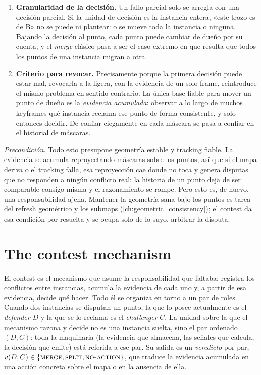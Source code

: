 \begin{enumerate}
  \item \textbf{Granularidad de la decisión.}
  Un fallo parcial solo se arregla con una decisión parcial. Si la unidad de decisión es la
  instancia entera, «este trozo es de B» no se puede ni plantear: o se mueve toda la instancia
  o ninguna. Bajando la decisión al punto, cada punto puede cambiar de dueño por su cuenta, y
  el \emph{merge} clásico pasa a ser el caso extremo en que resulta que todos los puntos de
  una instancia migran a otra.

  \item \textbf{Criterio para revocar.}
  Precisamente porque la primera decisión puede estar mal, revocarla a la ligera, con la
  evidencia de un solo frame, reintroduce el mismo problema en sentido contrario. La única
  base fiable para mover un punto de dueño es la \emph{evidencia acumulada}: observar a lo
  largo de muchos \foreignlanguage{english}{keyframes} qué instancia reclama ese punto de
  forma consistente, y solo entonces decidir. De confiar ciegamente en cada máscara se pasa a
  confiar en el historial de máscaras.
\end{enumerate}

\medskip
\noindent\emph{Precondición.} Todo esto presupone geometría estable y
\foreignlanguage{english}{tracking} fiable. La evidencia se acumula reproyectando máscaras
sobre los puntos, así que si el mapa deriva o el \foreignlanguage{english}{tracking} falla,
esa reproyección cae donde no toca y genera disputas que no responden a ningún conflicto
real: la historia de un punto deja de ser comparable consigo misma y el razonamiento se
rompe. Pero esto es, de nuevo, una responsabilidad ajena. Mantener la geometría sana bajo
los puntos es tarea del \foreignlanguage{english}{refresh} geométrico y los
\foreignlanguage{english}{submaps} (\ref{ch:geometric_consistency}); el contest da esa
condición por resuelta y se ocupa solo de lo suyo, arbitrar la disputa.

\section{The contest mechanism}
\label{sec:contest_mechanism}

El contest es el mecanismo que asume la responsabilidad que faltaba: registra los conflictos
entre instancias, acumula la evidencia de cada uno y, a partir de esa evidencia, decide qué
hacer. Todo él se organiza en torno a un par de roles. Cuando dos instancias se disputan un
punto, la que lo posee actualmente es el \emph{defender} $D$ y la que se lo reclama es el
\emph{challenger} $C$. La unidad sobre la que el mecanismo razona y decide no es una
instancia suelta, sino el par ordenado $(D, C)$: toda la maquinaria (la evidencia que
almacena, las señales que calcula, la decisión que emite) está referida a ese par. Su salida
es un \emph{veredicto} por par, $v(D, C) \in \{\textsc{merge}, \textsc{split},
\textsc{no-action}\}$, que traduce la evidencia acumulada en una acción concreta sobre el
mapa o en la ausencia de ella.

